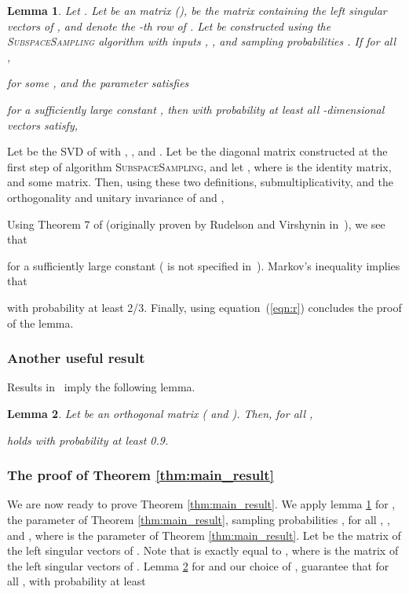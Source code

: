\documentclass[11pt]{article}
\newtheorem{lemma}{Lemma}
\newenvironment{Proof}{\noindent {\em Proof:}}{\\\hspace*{\fill}\mbox{}}
\begin{document}
\begin{lemma}
\label{lemma:subspace-sampling} Let . Let
 be an  matrix (),  be the  matrix containing the left singular vectors of ,
and  denote the -th row of . Let
 be constructed using the \textsc{SubspaceSampling}
algorithm with inputs , , and sampling probabilities
. If for all ,

for some , and the parameter  satisfies

for a sufficiently large constant , then with probability at
least  all -dimensional vectors  satisfy,

\end{lemma}
\begin{Proof}
Let  be the SVD of
 with , , and . Let  be the  diagonal matrix
constructed at the first step of algorithm
\textsc{SubspaceSampling}, and let , where  is the  identity matrix, and  some  matrix. Then, using these two definitions,
submultiplicativity, and the orthogonality and unitary invariance
of  and ,

Using Theorem 7 of \cite{DMM07} (originally proven by Rudelson and
Virshynin in~\cite{RV06}), we see that

for a sufficiently large constant  ( is not specified
in~\cite{RV06}). Markov's inequality implies that

with probability at least 2/3. Finally, using
equation~(\ref{eqn:r}) concludes the proof of the lemma.
\end{Proof}
\clearpage
\subsubsection{Another useful result}
Results in~\cite{AC06} imply the following lemma.
\begin{lemma}
\label{lem:HU} Let  be an  orthogonal matrix ( and ). Then, for all ,

holds with probability at least 0.9.
\end{lemma}


\subsubsection{The proof of Theorem \ref{thm:main_result}}
We are now ready to prove Theorem \ref{thm:main_result}. We apply
lemma \ref{lemma:subspace-sampling} for
, the parameter  of Theorem
\ref{thm:main_result}, sampling probabilities , for all
, , and , where  is the
parameter of Theorem \ref{thm:main_result}. Let  be the
 matrix of the left singular vectors of .
Note that  is exactly equal to , where  is the
 matrix of the left singular vectors of . Lemma \ref{lem:HU} for  and our choice of , guarantee that
for all , with probability at least 
\end{document}
